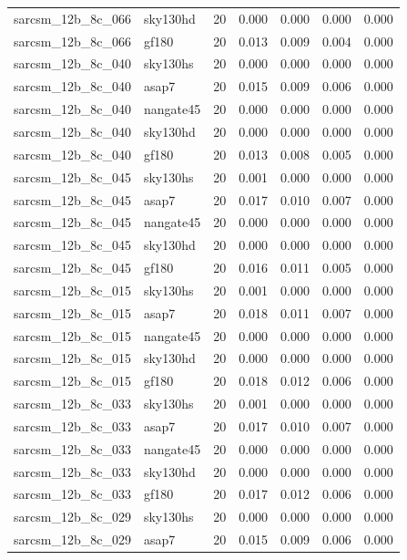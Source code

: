 \begin{tabular}{llrrrrr}
sarcsm\_12b\_8c\_066 & sky130hd & 20 & 0.000 & 0.000 & 0.000 & 0.000 \\
sarcsm\_12b\_8c\_066 & gf180 & 20 & 0.013 & 0.009 & 0.004 & 0.000 \\
sarcsm\_12b\_8c\_040 & sky130hs & 20 & 0.000 & 0.000 & 0.000 & 0.000 \\
sarcsm\_12b\_8c\_040 & asap7 & 20 & 0.015 & 0.009 & 0.006 & 0.000 \\
sarcsm\_12b\_8c\_040 & nangate45 & 20 & 0.000 & 0.000 & 0.000 & 0.000 \\
sarcsm\_12b\_8c\_040 & sky130hd & 20 & 0.000 & 0.000 & 0.000 & 0.000 \\
sarcsm\_12b\_8c\_040 & gf180 & 20 & 0.013 & 0.008 & 0.005 & 0.000 \\
sarcsm\_12b\_8c\_045 & sky130hs & 20 & 0.001 & 0.000 & 0.000 & 0.000 \\
sarcsm\_12b\_8c\_045 & asap7 & 20 & 0.017 & 0.010 & 0.007 & 0.000 \\
sarcsm\_12b\_8c\_045 & nangate45 & 20 & 0.000 & 0.000 & 0.000 & 0.000 \\
sarcsm\_12b\_8c\_045 & sky130hd & 20 & 0.000 & 0.000 & 0.000 & 0.000 \\
sarcsm\_12b\_8c\_045 & gf180 & 20 & 0.016 & 0.011 & 0.005 & 0.000 \\
sarcsm\_12b\_8c\_015 & sky130hs & 20 & 0.001 & 0.000 & 0.000 & 0.000 \\
sarcsm\_12b\_8c\_015 & asap7 & 20 & 0.018 & 0.011 & 0.007 & 0.000 \\
sarcsm\_12b\_8c\_015 & nangate45 & 20 & 0.000 & 0.000 & 0.000 & 0.000 \\
sarcsm\_12b\_8c\_015 & sky130hd & 20 & 0.000 & 0.000 & 0.000 & 0.000 \\
sarcsm\_12b\_8c\_015 & gf180 & 20 & 0.018 & 0.012 & 0.006 & 0.000 \\
sarcsm\_12b\_8c\_033 & sky130hs & 20 & 0.001 & 0.000 & 0.000 & 0.000 \\
sarcsm\_12b\_8c\_033 & asap7 & 20 & 0.017 & 0.010 & 0.007 & 0.000 \\
sarcsm\_12b\_8c\_033 & nangate45 & 20 & 0.000 & 0.000 & 0.000 & 0.000 \\
sarcsm\_12b\_8c\_033 & sky130hd & 20 & 0.000 & 0.000 & 0.000 & 0.000 \\
sarcsm\_12b\_8c\_033 & gf180 & 20 & 0.017 & 0.012 & 0.006 & 0.000 \\
sarcsm\_12b\_8c\_029 & sky130hs & 20 & 0.000 & 0.000 & 0.000 & 0.000 \\
sarcsm\_12b\_8c\_029 & asap7 & 20 & 0.015 & 0.009 & 0.006 & 0.000 \\

\end{tabular}
